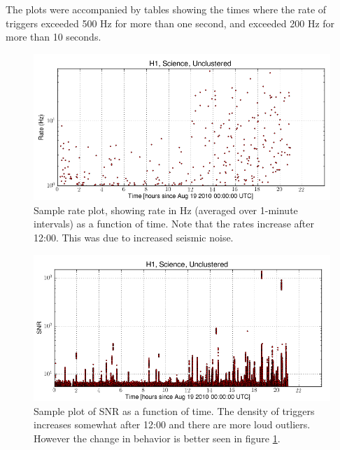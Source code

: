 The plots were accompanied by tables showing the times where the
rate of triggers exceeded 500 Hz for more than one second, and
exceeded 200 Hz for more than 10 seconds.

\begin{figure}
  \includegraphics[width=\linewidth]{figures/detchar/H1_0_UNCLUSTERED_rate_vs_time.png}
  \caption[Daily ihope rate plot]{
  \label{f:daily_ihope_rate_v_time}
Sample rate plot, showing rate in Hz (averaged over
1-minute intervals) as a function of time.  Note that the rates
increase after 12:00.  This was due to increased seismic noise.}
\end{figure}%

\begin{figure}
  \includegraphics[width=\linewidth]{figures/detchar/H1_0_UNCLUSTERED_snr_vs_time.png}
  \caption[Daily ihope SNR plot as a function of time]{
  \label{f:daily_ihope_snr_v_time}
Sample plot of SNR as a function of time.  The density of
triggers increases somewhat after 12:00 and there are more loud
outliers.  However the change in behavior is better seen in 
figure \ref{f:daily_ihope_rate_v_time}.}
\end{figure}%

